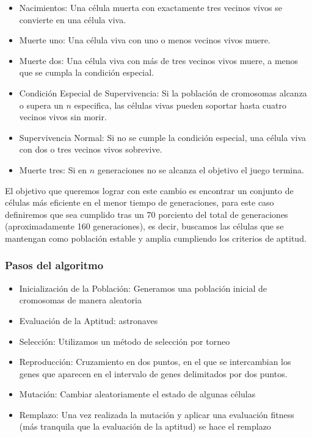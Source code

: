 \begin{itemize}
    \item Nacimientos: Una célula muerta con exactamente tres vecinos vivos se convierte 
    en una célula viva.
    \item Muerte uno: Una célula viva con uno o menos vecinos vivos muere.
    \item Muerte dos: Una célula viva con más de tres vecinos vivos muere, a menos que se 
    cumpla la condición especial.
    \item Condición Especial de Supervivencia: Si la población de cromosomas alcanza o 
    supera un $n$ especifica, las células vivas pueden soportar hasta cuatro 
    vecinos vivos sin morir.
    \item Supervivencia Normal: Si no se cumple la condición especial, una célula viva con 
    dos o tres vecinos vivos sobrevive.
    \item Muerte tres: Si en $n$ generaciones no se alcanza el objetivo el juego termina.
\end{itemize}

El objetivo que queremos lograr con este cambio es encontrar un conjunto de células más eficiente
en el menor tiempo de generaciones, para este caso definiremos que sea cumplido tras un 
70 porciento del total de generaciones (aproximadamente 160 generaciones), es decir, buscamos 
las células que se mantengan como población estable y amplia cumpliendo los criterios de aptitud.

\subsubsection*{Pasos del algoritmo}

\begin{itemize}
    \item Inicialización de la Población: Generamos una población inicial de cromosomas de 
    manera aleatoria
    \item Evaluación de la Aptitud: astronaves
    \item Selección: Utilizamos un método de selección por torneo
    \item Reproducción: Cruzamiento en dos puntos, en el que se intercambian los genes que 
    aparecen en el intervalo de genes delimitados por dos puntos.
    \item Mutación: Cambiar aleatoriamente el estado de algunas células
    \item Remplazo: Una vez realizada la mutación y aplicar una evaluación fitness (más 
    tranquila que la evaluación de la aptitud) se hace el remplazo
\end{itemize}


